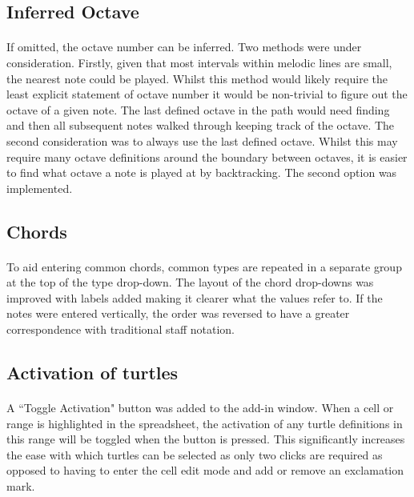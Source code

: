 \subsection{Inferred Octave}

\paragraph{} If omitted, the octave number can be inferred. Two methods were under consideration. Firstly, given that most intervals within melodic lines are small, the nearest note could be played.
Whilst this method would likely require the least explicit statement of octave number it would be non-trivial to figure out the octave of a given note. The last defined octave in the path would need finding and then all subsequent notes walked through keeping track of the octave. The second consideration was to always use the last defined octave. Whilst this may require many octave definitions around the boundary between octaves, it is easier to find what octave a note is played at by backtracking. The second option was implemented.

\subsection{Chords}

\paragraph{} To aid entering common chords, common types are repeated in a separate group at the top of the type drop-down. The layout of the chord drop-downs was improved with labels added making it clearer what the values refer to. If the notes were entered vertically, the order was reversed to have a greater correspondence with traditional staff notation.

\subsection{Activation of turtles}

\paragraph{} A ``Toggle Activation" button was added to the add-in window. When a cell or range is highlighted in the spreadsheet, the activation of any turtle definitions in this range will be toggled when the button is pressed.  This significantly increases the ease with which turtles can be selected as only two clicks are required as opposed to having to enter the cell edit mode and add or remove an exclamation mark.

